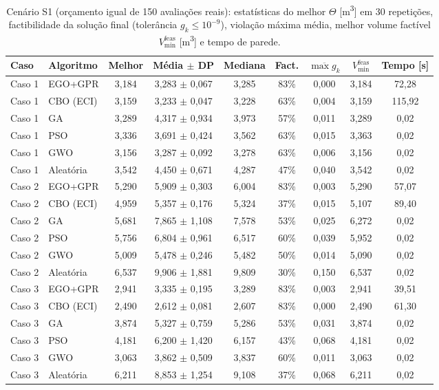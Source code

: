 \begin{table}[!t]
    \centering
    \caption{Cenário S1 (orçamento igual de 150 avaliações reais): estatísticas do melhor $\Theta$ [\si{\meter\cubed}] em 30 repetições, factibilidade da solução final (tolerância $g_k \le 10^{-9}$), violação máxima média, melhor volume factível $V^{\mathrm{feas}}_{\min}$ [\si{\meter\cubed}] e tempo de parede.}
    \label{tab:s1}
    \small
    \begin{tabular}{llccccccc}
        \toprule
        Caso & Algoritmo & Melhor & Média $\pm$ DP & Mediana & Fact. & $\overline{\max g_k}$ & $V^{\mathrm{feas}}_{\min}$ & Tempo [s] \\
        \midrule
        Caso 1 & EGO+GPR & 3,184 & 3,283 $\pm$ 0,067 & 3,285 & 83\% & 0,000 & 3,184 & 72,28 \\
        Caso 1 & CBO (ECI) & 3,159 & 3,233 $\pm$ 0,047 & 3,228 & 63\% & 0,004 & 3,159 & 115,92 \\
        Caso 1 & GA & 3,289 & 4,317 $\pm$ 0,934 & 3,973 & 57\% & 0,011 & 3,289 & 0,02 \\
        Caso 1 & PSO & 3,336 & 3,691 $\pm$ 0,424 & 3,562 & 63\% & 0,015 & 3,363 & 0,02 \\
        Caso 1 & GWO & 3,156 & 3,287 $\pm$ 0,092 & 3,278 & 63\% & 0,006 & 3,156 & 0,02 \\
        Caso 1 & Aleatória & 3,542 & 4,450 $\pm$ 0,671 & 4,287 & 47\% & 0,040 & 3,542 & 0,02 \\
        \midrule
        Caso 2 & EGO+GPR & 5,290 & 5,909 $\pm$ 0,303 & 6,004 & 83\% & 0,003 & 5,290 & 57,07 \\
        Caso 2 & CBO (ECI) & 4,959 & 5,357 $\pm$ 0,176 & 5,324 & 37\% & 0,015 & 5,107 & 89,40 \\
        Caso 2 & GA & 5,681 & 7,865 $\pm$ 1,108 & 7,578 & 53\% & 0,025 & 6,272 & 0,02 \\
        Caso 2 & PSO & 5,756 & 6,804 $\pm$ 0,961 & 6,517 & 60\% & 0,039 & 5,952 & 0,02 \\
        Caso 2 & GWO & 5,009 & 5,478 $\pm$ 0,246 & 5,482 & 50\% & 0,014 & 5,090 & 0,02 \\
        Caso 2 & Aleatória & 6,537 & 9,906 $\pm$ 1,881 & 9,809 & 30\% & 0,150 & 6,537 & 0,02 \\
        \midrule
        Caso 3 & EGO+GPR & 2,941 & 3,335 $\pm$ 0,195 & 3,289 & 83\% & 0,003 & 2,941 & 39,51 \\
        Caso 3 & CBO (ECI) & 2,490 & 2,612 $\pm$ 0,081 & 2,607 & 83\% & 0,000 & 2,490 & 61,30 \\
        Caso 3 & GA & 3,874 & 5,327 $\pm$ 0,759 & 5,286 & 53\% & 0,031 & 3,874 & 0,02 \\
        Caso 3 & PSO & 4,181 & 6,200 $\pm$ 1,420 & 6,157 & 43\% & 0,068 & 4,181 & 0,02 \\
        Caso 3 & GWO & 3,063 & 3,862 $\pm$ 0,509 & 3,837 & 60\% & 0,011 & 3,063 & 0,02 \\
        Caso 3 & Aleatória & 6,211 & 8,853 $\pm$ 1,254 & 9,108 & 37\% & 0,068 & 6,211 & 0,02 \\
        \bottomrule
    \end{tabular}
\end{table}
